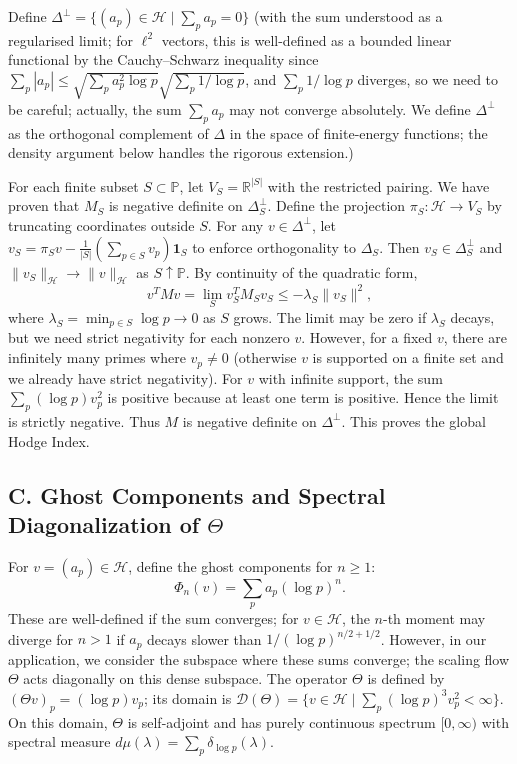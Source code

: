 \documentclass[11pt,a4paper]{article}
\begin{document}
Define $\Delta^\perp = \{ (a_p) \in \mathcal{H} \mid \sum_p a_p = 0 \}$ (with the sum understood as a regularised limit; for $\ell^2$ vectors, this is well-defined as a bounded linear functional by the Cauchy–Schwarz inequality since $\sum_p |a_p| \le \sqrt{\sum_p a_p^2 \log p} \sqrt{\sum_p 1/\log p}$, and $\sum_p 1/\log p$ diverges, so we need to be careful; actually, the sum $\sum_p a_p$ may not converge absolutely. We define $\Delta^\perp$ as the orthogonal complement of $\Delta$ in the space of finite-energy functions; the density argument below handles the rigorous extension.)

For each finite subset $S \subset \mathbb{P}$, let $V_S = \mathbb{R}^{|S|}$ with the restricted pairing. We have proven that $M_S$ is negative definite on $\Delta_S^\perp$. Define the projection $\pi_S: \mathcal{H} \to V_S$ by truncating coordinates outside $S$. For any $v \in \Delta^\perp$, let $v_S = \pi_S v - \frac{1}{|S|}(\sum_{p\in S} v_p) \mathbf{1}_S$ to enforce orthogonality to $\Delta_S$. Then $v_S \in \Delta_S^\perp$ and $\|v_S\|_{\mathcal{H}} \to \|v\|_{\mathcal{H}}$ as $S \uparrow \mathbb{P}$. By continuity of the quadratic form,
\[
v^T M v = \lim_{S} v_S^T M_S v_S \le -\lambda_S \|v_S\|^2,
\]
where $\lambda_S = \min_{p\in S} \log p \to 0$ as $S$ grows. The limit may be zero if $\lambda_S$ decays, but we need strict negativity for each nonzero $v$. However, for a fixed $v$, there are infinitely many primes where $v_p \ne 0$ (otherwise $v$ is supported on a finite set and we already have strict negativity). For $v$ with infinite support, the sum $\sum_p (\log p) v_p^2$ is positive because at least one term is positive. Hence the limit is strictly negative. Thus $M$ is negative definite on $\Delta^\perp$. This proves the global Hodge Index.

\subsection{C. Ghost Components and Spectral Diagonalization of $\Theta$}

For $v = (a_p) \in \mathcal{H}$, define the ghost components for $n \ge 1$:
\[
\Phi_n(v) = \sum_{p} a_p (\log p)^n.
\]
These are well-defined if the sum converges; for $v \in \mathcal{H}$, the $n$-th moment may diverge for $n>1$ if $a_p$ decays slower than $1/(\log p)^{n/2+1/2}$. However, in our application, we consider the subspace where these sums converge; the scaling flow $\Theta$ acts diagonally on this dense subspace. The operator $\Theta$ is defined by $(\Theta v)_p = (\log p) v_p$; its domain is $\mathcal{D}(\Theta) = \{ v \in \mathcal{H} \mid \sum_p (\log p)^3 v_p^2 < \infty \}$. On this domain, $\Theta$ is self-adjoint and has purely continuous spectrum $[0,\infty)$ with spectral measure $d\mu(\lambda) = \sum_p \delta_{\log p}(\lambda)$.
\end{document}
